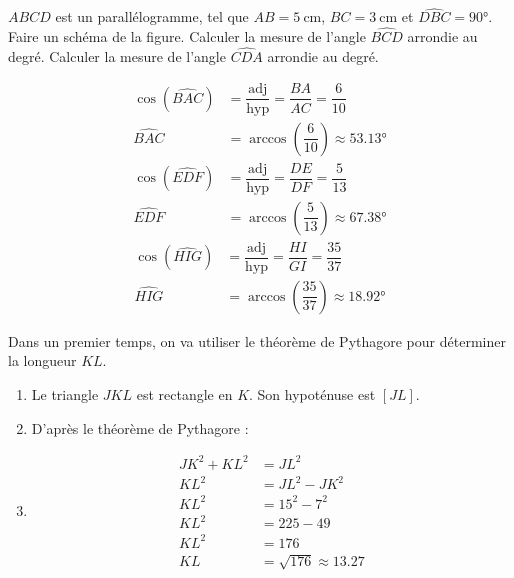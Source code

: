 \documentclass["../Cours.tex"]{subfiles}
\begin{document}
\begin{questions}
    \exercice $ABCD$ est un parallélogramme, tel que $AB=\qty{5}{\centi\metre}$, $BC=\qty{3}{\centi\metre}$ et $\widehat{DBC}=\ang{90}$.
    \question Faire un schéma de la figure.
    \question Calculer la mesure de l'angle $\widehat{BCD}$ arrondie au degré.
    \question Calculer la mesure de l'angle $\widehat{CDA}$ arrondie au degré.
\end{questions}

\clearpage
\CORRECTIONS
\begin{questions}
    \exercice 
    \question 
    \begin{align*}
        \cos{(\widehat{BAC})} &= \dfrac{\mbox{adj}}{\mbox{hyp}} = \dfrac{BA}{AC} = \dfrac{6}{10}\\
        \widehat{BAC} &= \arccos{\left(\dfrac{6}{10}\right)} \approx \ang{53.13}
    \end{align*}
    \question 
    \begin{align*}
        \cos{(\widehat{EDF})} &= \dfrac{\mbox{adj}}{\mbox{hyp}} = \dfrac{DE}{DF} = \dfrac{5}{13}\\
        \widehat{EDF} &= \arccos{\left(\dfrac{5}{13}\right)} \approx \ang{67.38}
    \end{align*}
    \question 
    \begin{align*}
        \cos{(\widehat{HIG})} &= \dfrac{\mbox{adj}}{\mbox{hyp}} = \dfrac{HI}{GI} = \dfrac{35}{37}\\
        \widehat{HIG} &= \arccos{\left(\dfrac{35}{37}\right)} \approx \ang{18.92}
    \end{align*}

    \exercice 
    Dans un premier temps, on va utiliser le théorème de Pythagore pour déterminer la longueur $KL$.
    \begin{enumerate}
        \item Le triangle $JKL$ est rectangle en $K$. Son hypoténuse est $[JL]$.
        \item D'après le théorème de Pythagore :
        \item 
        \begin{align*}
            JK^2+KL^2 &= JL^2 \\
            KL^2 &= JL^2 - JK^2 \\
            KL^2 &= 15^2-7^2 \\
            KL^2 &= 225-49 \\ 
            KL^2 &= 176 \\ 
            KL &= \sqrt{176} \approx \num{13.27} 
        \end{align*}
    \end{enumerate}


\end{questions}
\end{document}
